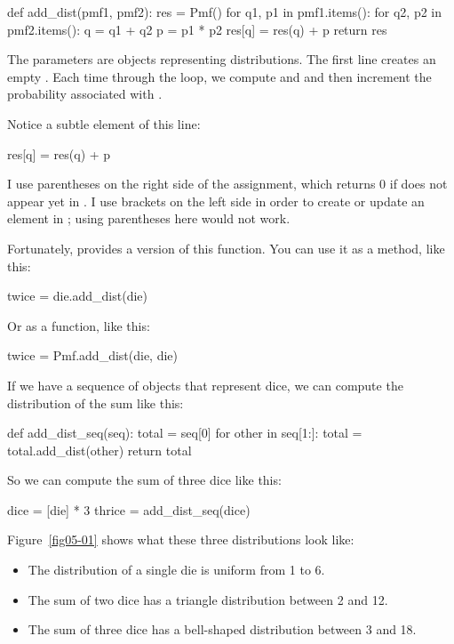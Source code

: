 \documentclass[12pt]{book}
\theoremstyle{exercise}
\begin{document}
\begin{code}
def add_dist(pmf1, pmf2):
    res = Pmf()
    for q1, p1 in pmf1.items():
        for q2, p2 in pmf2.items():
            q = q1 + q2
            p = p1 * p2
            res[q] = res(q) + p
    return res
\end{code}

The parameters are  objects representing distributions.
The first line creates an empty .
Each time through the loop, we compute  and  and then increment the probability associated with .

Notice a subtle element of this line:

\begin{code}
            res[q] = res(q) + p
\end{code}

I use parentheses on the right side of the assignment, which returns 0 if  does not appear yet in .
I use brackets on the left side in order to create or update an element in ; using parentheses here would not work.

Fortunately,  provides a version of this function.
You can use it as a method, like this:

\begin{code}
twice = die.add_dist(die)
\end{code}

Or as a function, like this:

\begin{code}
twice = Pmf.add_dist(die, die)
\end{code}

If we have a sequence of  objects that represent dice, we can compute the distribution of the sum like this:

\begin{code}
def add_dist_seq(seq):
    total = seq[0]
    for other in seq[1:]:
        total = total.add_dist(other)
    return total
\end{code}

So we can compute the sum of three dice like this:

\begin{code}
dice = [die] * 3
thrice = add_dist_seq(dice)
\end{code}

Figure~\ref{fig05-01} shows what these three distributions look like:

\begin{itemize}

\item The distribution of a single die is uniform from 1 to 6.

\item The sum of two dice has a triangle distribution between 2 and 12.

\item The sum of three dice has a bell-shaped distribution between 3 and 18.

\end{itemize}
\end{document}
